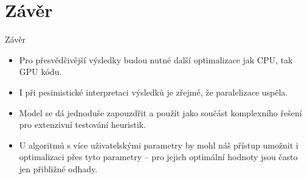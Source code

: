 \documentclass[compress,mathserif]{beamer}
\theoremstyle{definition}
\theoremstyle{plain}
\newcommand{\beI}{\begin{itemize}}
\newcommand{\enI}{\end{itemize}}
\begin{document}
\section{Závěr}
    \begin{frame}{Závěr}
        \beI
            \item Pro přesvědčivější výsledky budou nutné další optimalizace jak CPU, tak GPU kódu.
            \item I při pesimistické interpretaci výsledků je zřejmé, že paralelizace uspěla.
            \item Model se dá jednoduše zapouzdřit a použít jako součást komplexního řešení pro extenzivní testování heuristik.
            \item U algoritmů s více uživatelskými parametry by mohl náš přístup umožnit i optimalizaci přes tyto parametry -- pro jejich optimální hodnoty jsou často jen přibližné odhady.
        \enI
    \end{frame}
    
    \begin{frame}
        \vfill
        \vfill
    \end{frame}
    
\end{document}
